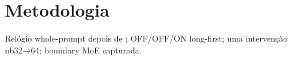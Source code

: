 \section{Metodologia}
Relógio whole-prompt depois de ; OFF/OFF/ON long-first; uma intervenção ub32→64; boundary MoE capturada. 
